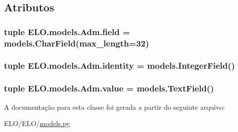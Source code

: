 \subsection{Atributos}
\hypertarget{classELO_1_1models_1_1Adm_ae1af4ca22491b1cfe9cb0a7acefaa71e}{
\subsubsection[{field}]{\setlength{\rightskip}{0pt plus 5cm}tuple E\-L\-O.\-models.\-Adm.\-field = models.\-Char\-Field(max\-\_\-length=32)\hspace{0.3cm}{\ttfamily [static]}}}\label{classELO_1_1models_1_1Adm_ae1af4ca22491b1cfe9cb0a7acefaa71e}
\hypertarget{classELO_1_1models_1_1Adm_af7e7b797ce5d3396e8a54d8927450d75}{
\subsubsection[{identity}]{\setlength{\rightskip}{0pt plus 5cm}tuple E\-L\-O.\-models.\-Adm.\-identity = models.\-Integer\-Field()\hspace{0.3cm}{\ttfamily [static]}}}\label{classELO_1_1models_1_1Adm_af7e7b797ce5d3396e8a54d8927450d75}
\hypertarget{classELO_1_1models_1_1Adm_a98f249c493fbcbcd347297437a098212}{
\subsubsection[{value}]{\setlength{\rightskip}{0pt plus 5cm}tuple E\-L\-O.\-models.\-Adm.\-value = models.\-Text\-Field()\hspace{0.3cm}{\ttfamily [static]}}}\label{classELO_1_1models_1_1Adm_a98f249c493fbcbcd347297437a098212}


A documentação para esta classe foi gerada a partir do seguinte arquivo\-:\begin{DoxyCompactItemize}
\item 
E\-L\-O/\-E\-L\-O/\hyperlink{ELO_2models_8py}{models.\-py}\end{DoxyCompactItemize}
